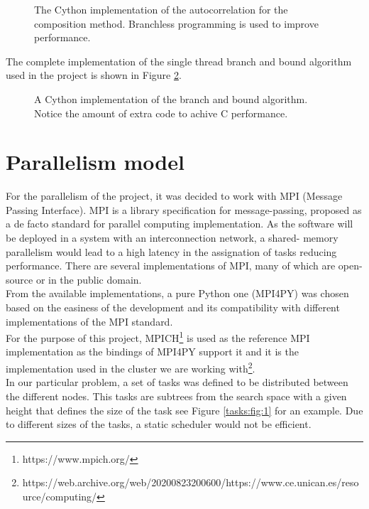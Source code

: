       \begin{figure}[ht!]
        \caption{The Cython implementation of the autocorrelation for the composition method.  Branchless programming is used to improve performance.}
        \label{composite_auto:fig:1}
      \end{figure}

  The complete implementation of the single thread branch and bound algorithm used
  in the project is shown in Figure \ref{composite_auto:fig:2}.

  \begin{figure}[ht!]
    \caption{A Cython implementation of the branch and bound algorithm. Notice
    the amount of extra code to achive C performance.}
    \label{composite_auto:fig:2}
  \end{figure}


  \section{Parallelism model}

  For the parallelism of the project, it was decided to work with MPI (Message
  Passing Interface).  MPI is a library specification for message-passing, proposed
  as a de facto standard for parallel computing implementation. As the software
  will be deployed in a system with an interconnection network, a shared-
  memory parallelism would lead to a high latency in the assignation of tasks
  reducing performance. There are several implementations of MPI, many of which are
  open-source or in the public domain.\\

 From the available implementations, a pure
 Python one (MPI4PY) was chosen based on the easiness of the development and
 its compatibility with different implementations of the MPI standard.\\ For the
 purpose of this project, MPICH\footnote{https://www.mpich.org/} is used as the
 reference MPI implementation as the bindings of MPI4PY support it and it is the
 implementation used in the cluster we are working with\footnote{https://web.archive.org/web/20200823200600/https://www.ce.unican.es/resource/computing/}.\\

  In our particular problem, a set of tasks was defined to be
  distributed between the different nodes. This tasks are subtrees from the
  search space with a given height that defines the size of the task  see Figure
  \ref{tasks:fig:1} for an example. Due to different sizes of the tasks,  a static
  scheduler would not be efficient.\\



